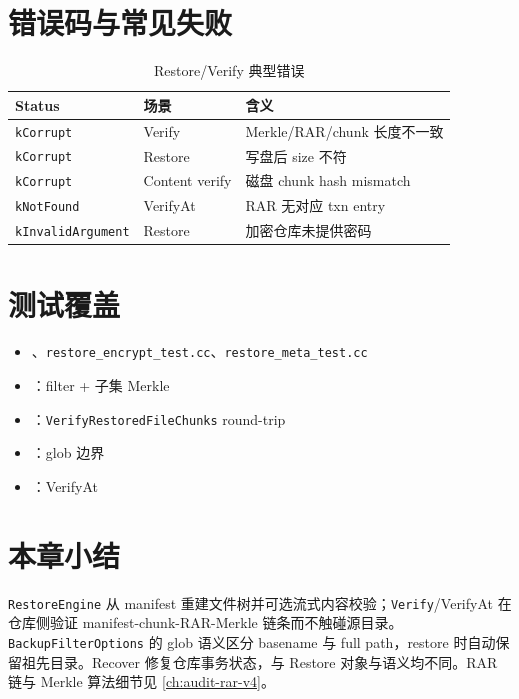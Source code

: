 \section{错误码与常见失败}

\begin{table}[htbp]
\centering
\caption{Restore/Verify 典型错误}
\small
\begin{tabular}{@{}llp{6cm}@{}}
\toprule
Status & 场景 & 含义 \\
\midrule
\texttt{kCorrupt} & Verify & Merkle/RAR/chunk 长度不一致 \\
\texttt{kCorrupt} & Restore & 写盘后 size 不符 \\
\texttt{kCorrupt} & Content verify & 磁盘 chunk hash mismatch \\
\texttt{kNotFound} & VerifyAt & RAR 无对应 txn entry \\
\texttt{kInvalidArgument} & Restore & 加密仓库未提供密码 \\
\bottomrule
\end{tabular}
\end{table}

\section{测试覆盖}

\begin{itemize}[nosep]
  \item {}、\texttt{restore\_encrypt\_test.cc}、\texttt{restore\_meta\_test.cc}
  \item {}：filter + 子集 Merkle
  \item {}：\texttt{VerifyRestoredFileChunks} round-trip
  \item {}：glob 边界
  \item {}：VerifyAt
\end{itemize}

\section{本章小结}

\texttt{RestoreEngine} 从 manifest 重建文件树并可选流式内容校验；\texttt{Verify}/VerifyAt 在仓库侧验证 manifest-chunk-RAR-Merkle 链条而不触碰源目录。\texttt{BackupFilterOptions} 的 glob 语义区分 basename 与 full path，restore 时自动保留祖先目录。Recover 修复仓库事务状态，与 Restore 对象与语义均不同。RAR 链与 Merkle 算法细节见 \cref{ch:audit-rar-v4}。
